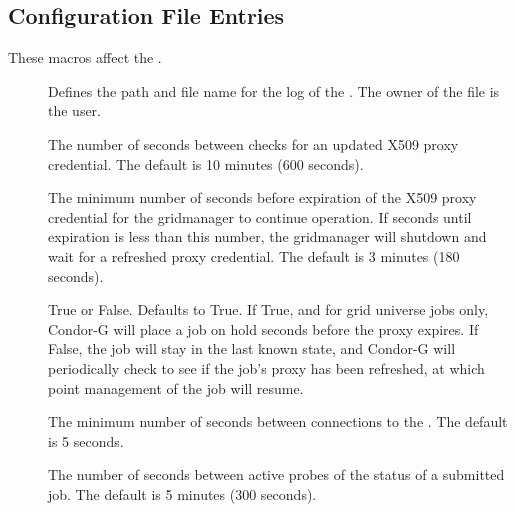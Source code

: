 \subsection{\label{sec:Gridmanager-Config-File-Entries}
Configuration File Entries}

These macros affect the .
\begin{description}

\item[]
\label{param:GridmanagerLog} Defines the path and file name
  for the log of the . 
  The owner of the file is the  user.

\item[]
\label{param:GridmanagerCheckproxyInterval} The number of seconds
between checks for an updated X509 proxy credential. The default
is 10 minutes (600 seconds).

\item[]
\label{param:GridmanagerMinimumProxyTime} The minimum number of
seconds before expiration of the X509 proxy credential for the
gridmanager to continue operation. If seconds until expiration is
less than this number, the gridmanager will shutdown and wait for
a refreshed proxy credential. The default is 3 minutes (180 seconds).

\item[]
\label{param:HoldJobIfCredentialExpires} True or False.
Defaults to True.
If True, and for grid universe jobs only,
Condor-G will place a job on hold
 seconds
before the proxy expires.
If False,
the job will stay in the last known state,
and Condor-G will periodically check to see if the job's proxy has been
refreshed, at which point management of the job will resume.

\item[]
\label{param:GridmanagerContactScheddDelay} The minimum number of
seconds between connections to the . The default is 5 seconds.

\item[]
\label{param:GridmanagerJobProbeInterval}
The number of seconds between
active probes of the status of a submitted job. The default is 5
minutes (300 seconds).


\end{description}
